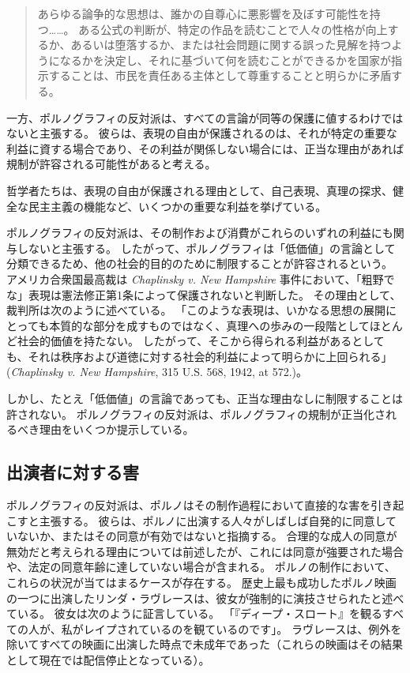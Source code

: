 \documentclass[paper=a4,book,openany]{jlreq}
\begin{document}
\begin{quote}

あらゆる論争的な思想は、誰かの自尊心に悪影響を及ぼす可能性を持つ……。
ある公式の判断が、特定の作品を読むことで人々の性格が向上するか、あるいは堕落するか、または社会問題に関する誤った見解を持つようになるかを決定し、それに基づいて何を読むことができるかを国家が指示することは、市民を責任ある主体として尊重することと明らかに矛盾する。
\citep[pp.206--208]{dworkin96:_freed_law}

\end{quote}

一方、ポルノグラフィの反対派は、すべての言論が同等の保護に値するわけではないと主張する。
彼らは、表現の自由が保護されるのは、それが特定の重要な利益に資する場合であり、その利益が関係しない場合には、正当な理由があれば規制が許容される可能性があると考える。

哲学者たちは、表現の自由が保護される理由として、自己表現、真理の探求、健全な民主主義の機能など、いくつかの重要な利益を挙げている\citep{scanlon11:_why_not_base_free_speec_auton_democ}。

ポルノグラフィの反対派は、その制作および消費がこれらのいずれの利益にも関与しないと主張する。
したがって、ポルノグラフィは「低価値」の言論として分類できるため、他の社会的目的のために制限することが許容されるという。
アメリカ合衆国最高裁は \emph{Chaplinsky v. New Hampshire} 事件において、「粗野でな」表現は憲法修正第1条によって保護されないと判断した。
その理由として、裁判所は次のように述べている。
「このような表現は、いかなる思想の展開にとっても本質的な部分を成すものではなく、真理への歩みの一段階としてほとんど社会的価値を持たない。
したがって、そこから得られる利益があるとしても、それは秩序および道徳に対する社会的利益によって明らかに上回られる」(\emph{Chaplinsky v. New Hampshire}, 315 U.S. 568, 1942, at 572.)。

しかし、たとえ「低価値」の言論であっても、正当な理由なしに制限することは許されない。
ポルノグラフィの反対派は、ポルノグラフィの規制が正当化されるべき理由をいくつか提示している。

\subsection{出演者に対する害}

ポルノグラフィの反対派は、ポルノはその制作過程において直接的な害を引き起こすと主張する。
彼らは、ポルノに出演する人々がしばしば自発的に同意していないか、またはその同意が有効ではないと指摘する。
合理的な成人の同意が無効だと考えられる理由については前述したが、これには同意が強要された場合や、法定の同意年齢に達していない場合が含まれる。
ポルノの制作において、これらの状況が当てはまるケースが存在する。
歴史上最も成功したポルノ映画の一つに出演したリンダ・ラヴレースは、彼女が強制的に演技させられたと述べている。
彼女は次のように証言している。
「『ディープ・スロート』を観るすべての人が、私がレイプされているのを観ているのです」\citep{bailey05:_insid_deep_throat}。
ラヴレースは、例外を除いてすべての映画に出演した時点で未成年であった（これらの映画はその結果として現在では配信停止となっている）。
\end{document}
